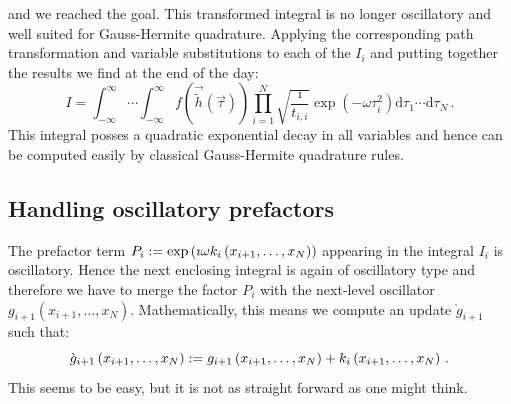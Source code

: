 \documentclass[a4paper,10pt]{article}
\begin{document}
and we reached the goal. This transformed integral is no longer
oscillatory and well suited for Gauss-Hermite quadrature.
Applying the corresponding path transformation and variable substitutions
to each of the $I_i$ and putting together the results we find at the end
of the day:
\begin{equation}\label{eq:transformed_integral}
\boxed{
 I = \int_{-\infty}^\infty \cdots \int_{-\infty}^\infty
       f\left(\vec{\tilde{h}}(\vec{\tau})\right)
       \prod_{i=1}^N \sqrt{\frac{\imath}{t_{i,i}}}
                     \exp\left(-\omega \tau_i^2\right)
    \mathrm{d}\tau_1 \cdots \mathrm{d}\tau_N \,.
}
\end{equation}
This integral posses a quadratic exponential decay in all variables and
hence can be computed easily by classical Gauss-Hermite quadrature
rules.


\subsection{Handling oscillatory prefactors}


The prefactor term $P_i := \exp\left(\imath \omega k_i\left(x_{i+1},\ldots,x_N\right)\right)$
appearing in the integral $I_i$ is oscillatory. Hence the next
enclosing integral is again of oscillatory type and therefore we
have to merge the factor $P_i$ with the next-level oscillator
$g_{i+1}\left(x_{i+1},\ldots,x_N\right)$.
Mathematically, this means we compute an update $\grave{g}_{i+1}$
such that:
\begin{equation}\label{eq:update_equation}
  \grave{g}_{i+1}\left(x_{i+1}, \ldots ,x_N\right)
  := g_{i+1}\left(x_{i+1}, \ldots ,x_N\right)
        + k_i\left(x_{i+1}, \ldots ,x_N\right) \,.
\end{equation}
This seems to be easy, but it is not as straight forward as
one might think.
\end{document}
